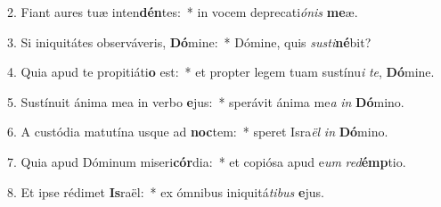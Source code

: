 2. Fiant aures tuæ inten\textbf{dén}tes:~*  in vocem deprecati\textit{ó}\textit{nis} \textbf{me}æ.\

3. Si iniquitátes observáveris, \textbf{Dó}mine:~*  Dómine, quis \textit{sus}\textit{ti}\textbf{né}bit?\

4. Quia apud te propitiáti\textbf{o} est:~*  et propter legem tuam sustínu\textit{i} \textit{te}, \textbf{Dó}mine.\

5. Sustínuit ánima mea in verbo \textbf{e}jus:~*  sperávit ánima me\textit{a} \textit{in} \textbf{Dó}mino.\

6. A custódia matutína usque ad \textbf{noc}tem:~*  speret Isra\textit{ël} \textit{in} \textbf{Dó}mino.\

7. Quia apud Dóminum miseri\textbf{cór}dia:~*  et copiósa apud e\textit{um} \textit{red}\textbf{émp}tio.\

8. Et ipse rédimet \textbf{Is}raël:~*  ex ómnibus iniquitá\textit{ti}\textit{bus} \textbf{e}jus.\

